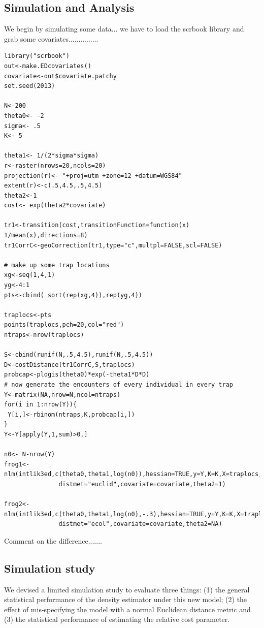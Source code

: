 \subsection{Simulation and Analysis}

We begin by simulating some data... we have to load the scrbook
library and grab some covariates...............

{\small 
\begin{verbatim}
library("scrbook")
out<-make.EDcovariates()
covariate<-out$covariate.patchy
set.seed(2013)

N<-200
theta0<- -2
sigma<- .5
K<- 5

theta1<- 1/(2*sigma*sigma)
r<-raster(nrows=20,ncols=20)
projection(r)<- "+proj=utm +zone=12 +datum=WGS84"
extent(r)<-c(.5,4.5,.5,4.5)
theta2<-1
cost<- exp(theta2*covariate)

tr1<-transition(cost,transitionFunction=function(x) 1/mean(x),directions=8)
tr1CorrC<-geoCorrection(tr1,type="c",multpl=FALSE,scl=FALSE)

# make up some trap locations
xg<-seq(1,4,1)
yg<-4:1
pts<-cbind( sort(rep(xg,4)),rep(yg,4))

traplocs<-pts
points(traplocs,pch=20,col="red")
ntraps<-nrow(traplocs)

S<-cbind(runif(N,.5,4.5),runif(N,.5,4.5))
D<-costDistance(tr1CorrC,S,traplocs)
probcap<-plogis(theta0)*exp(-theta1*D*D)
# now generate the encounters of every individual in every trap
Y<-matrix(NA,nrow=N,ncol=ntraps)
for(i in 1:nrow(Y)){
 Y[i,]<-rbinom(ntraps,K,probcap[i,])
}
Y<-Y[apply(Y,1,sum)>0,]

n0<- N-nrow(Y)
frog1<-nlm(intlik3ed,c(theta0,theta1,log(n0)),hessian=TRUE,y=Y,K=K,X=traplocs,
               distmet="euclid",covariate=covariate,theta2=1)

frog2<-nlm(intlik3ed,c(theta0,theta1,log(n0),-.3),hessian=TRUE,y=Y,K=K,X=traplocs,
               distmet="ecol",covariate=covariate,theta2=NA)
\end{verbatim}
}

Comment on the difference.......


\subsection{Simulation study}

We devised a limited simulation study to evaluate three things: (1)
the general statistical performance of the density estimator under
this new model; (2) the effect of mis-specifying the model with a
normal Euclidean distance metric and (3) the statistical performance
of estimating the relative cost parameter.

